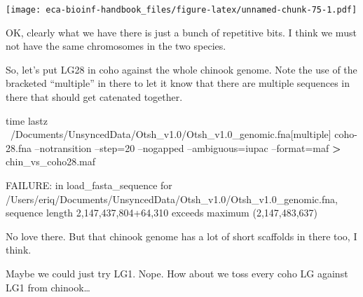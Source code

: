 \documentclass[]{krantz}
\makeatletter
\newenvironment{Shaded}{\begin{snugshade}}{\end{snugshade}}
\newcommand{\BuiltInTok}[1]{#1}
\newcommand{\CommentTok}[1]{\textcolor[rgb]{0.37,0.37,0.37}{\textit{#1}}}
\newcommand{\DataTypeTok}[1]{\textcolor[rgb]{0.27,0.27,0.27}{#1}}
\newcommand{\ExtensionTok}[1]{#1}
\newcommand{\FunctionTok}[1]{\textcolor[rgb]{0,0,0}{#1}}
\newcommand{\KeywordTok}[1]{\textcolor[rgb]{0.27,0.27,0.27}{\textbf{#1}}}
\newcommand{\NormalTok}[1]{#1}
\newcommand{\OperatorTok}[1]{\textcolor[rgb]{0.43,0.43,0.43}{\textbf{#1}}}
\newcommand{\StringTok}[1]{\textcolor[rgb]{0.5,0.5,0.5}{#1}}
\newcommand{\VariableTok}[1]{\textcolor[rgb]{0,0,0}{#1}}
\newenvironment{kframe}{%
\medskip{}
\setlength{\fboxsep}{.8em}
 \def\at@end@of@kframe{}%
 \ifinner\ifhmode%
  \def\at@end@of@kframe{\end{minipage}}%
  \begin{minipage}{\columnwidth}%
 \fi\fi%
 \def\FrameCommand##1{\hskip\@totalleftmargin \hskip-\fboxsep
 \colorbox{shadecolor}{##1}\hskip-\fboxsep
     \hskip-\linewidth \hskip-\@totalleftmargin \hskip\columnwidth}%
 \MakeFramed {\advance\hsize-\width
   \@totalleftmargin\z@ \linewidth\hsize
   \@setminipage}}%
 {\par\unskip\endMakeFramed%
 \at@end@of@kframe}
\renewenvironment{Shaded}{\begin{kframe}}{\end{kframe}}
\makeatother
\begin{document}
\texttt{[image: eca-bioinf-handbook\_files/figure-latex/unnamed-chunk-75-1.pdf]}

OK, clearly what we have there is just a bunch of repetitive bits. I think we must not have the same chromosomes in the two species.

So, let's put LG28 in coho against the whole chinook genome. Note the use of the
bracketed ``multiple'' in there to let it know that there are multiple sequences in there
that should get catenated together.

\begin{Shaded}
\begin{Highlighting}[]
\BuiltInTok{time}\NormalTok{ lastz ~/Documents/UnsyncedData/Otsh_v1.0/Otsh_v1.0_genomic.fna[multiple]  coho-28.fna --notransition --step=20 --nogapped --ambiguous=iupac --format=maf }\OperatorTok{>}\NormalTok{ chin_vs_coho28.maf}

\ExtensionTok{FAILURE}\NormalTok{: in load_fasta_sequence for /Users/eriq/Documents/UnsyncedData/Otsh_v1.0/Otsh_v1.0_genomic.fna, sequence length 2,147,437,804+64,310 exceeds maximum (2,147,483,637)}
\end{Highlighting}
\end{Shaded}

No love there. But that chinook genome has a lot of short scaffolds in there too, I think.

Maybe we could just try LG1. Nope. How about we toss every coho LG against LG1 from chinook\ldots{}

\begin{Shaded}
\end{Shaded}
\end{document}
